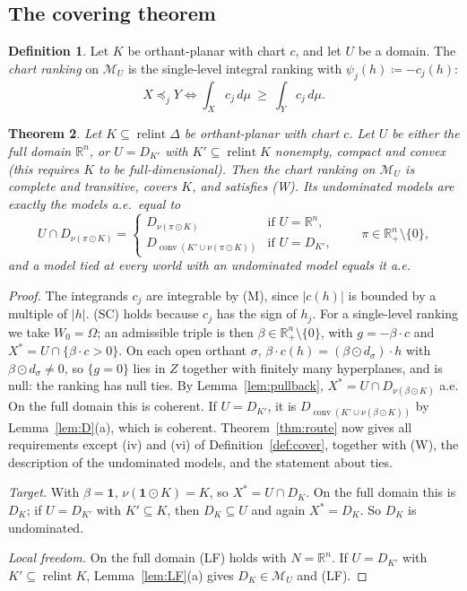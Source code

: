 \documentclass[11pt]{article}
\newcommand{\R}{\mathbb{R}}
\newcommand{\one}{\mathbf{1}}
\newcommand{\M}{\mathcal{M}}
\DeclareMathOperator{\conv}{conv}
\DeclareMathOperator{\relint}{relint}
\theoremstyle{plain}
\newtheorem{theorem}{Theorem}[section]
\theoremstyle{definition}
\newtheorem{definition}[theorem]{Definition}
\theoremstyle{remark}
\begin{document}
\subsection{The covering theorem}

\begin{definition}\label{def:chart}
Let $K$ be orthant-planar with chart $c$, and let $U$ be a domain. The \emph{chart ranking}
on $\M_U$ is the single-level integral ranking with $\psi_j(h)\coloneqq-c_j(h)$:
\[
  X\preceq_jY\iff\int_Xc_j\,d\mu\ \ge\ \int_Yc_j\,d\mu .
\]
\end{definition}

\begin{theorem}\label{thm:opcover}
Let $K\subseteq\relint\Delta$ be orthant-planar with chart $c$. Let $U$ be either the full
domain $\R^n$, or $U=D_{K'}$ with $K'\subseteq\relint K$ nonempty, compact and convex (this
requires $K$ to be full-dimensional). Then the chart ranking on $\M_U$ is complete and
transitive, covers $K$, and satisfies (W). Its undominated models are exactly the models
a.e.\ equal to
\[
  U\cap D_{\nu(\pi\odot K)}=
  \begin{cases}
    D_{\nu(\pi\odot K)}&\text{if }U=\R^n,\\
    D_{\conv(K'\cup\nu(\pi\odot K))}&\text{if }U=D_{K'},
  \end{cases}
  \qquad\pi\in\R^n_+\setminus\{0\},
\]
and a model tied at every world with an undominated model equals it a.e.
\end{theorem}

\begin{proof}
The integrands $c_j$ are integrable by (M), since $|c(h)|$ is bounded by a multiple of
$|h|$. (SC) holds because $c_j$ has the sign of $h_j$. For a single-level ranking we take
$W_0=\Omega$; an admissible triple is then $\beta\in\R^n_+\setminus\{0\}$, with
$g=-\beta\cdot c$ and $X^\ast=U\cap\{\beta\cdot c>0\}$. On each open orthant $\sigma$,
$\beta\cdot c(h)=(\beta\odot d_\sigma)\cdot h$ with $\beta\odot d_\sigma\ne0$, so $\{g=0\}$
lies in $Z$ together with finitely many hyperplanes, and is null: the ranking has null
ties. By Lemma~\ref{lem:pullback}, $X^\ast=U\cap D_{\nu(\beta\odot K)}$ a.e. On the full
domain this is coherent. If $U=D_{K'}$, it is $D_{\conv(K'\cup\nu(\beta\odot K))}$ by
Lemma~\ref{lem:D}(a), which is coherent. Theorem~\ref{thm:route} now gives all requirements
except (iv) and (vi) of Definition~\ref{def:cover}, together with (W), the description of
the undominated models, and the statement about ties.

\emph{Target.} With $\beta=\one$, $\nu(\one\odot K)=K$, so $X^\ast=U\cap D_K$. On the full
domain this is $D_K$; if $U=D_{K'}$ with $K'\subseteq K$, then $D_K\subseteq U$ and again
$X^\ast=D_K$. So $D_K$ is undominated.

\emph{Local freedom.} On the full domain (LF) holds with $N=\R^n$. If $U=D_{K'}$ with
$K'\subseteq\relint K$, Lemma~\ref{lem:LF}(a) gives $D_K\in\M_U$ and (LF).
\end{proof}
\end{document}
